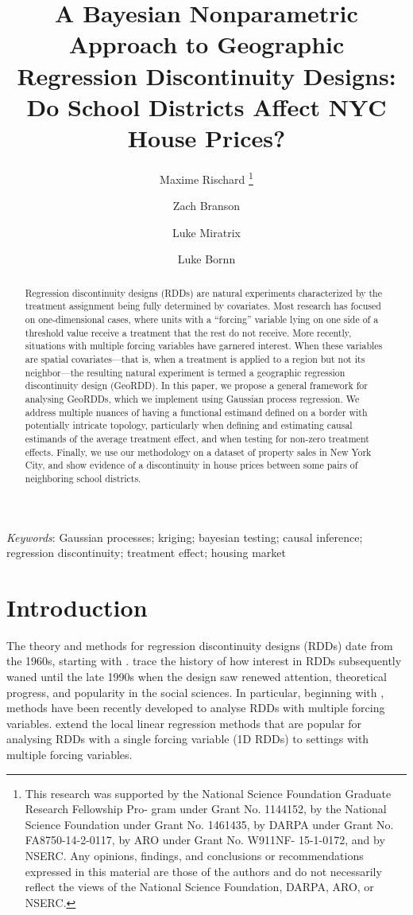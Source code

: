 \documentclass[letter,12pt]{article}
\title{
    \Large
    A Bayesian Nonparametric Approach to Geographic Regression Discontinuity Designs:
    Do School Districts Affect NYC House Prices?
}
\author[a]{Maxime Rischard
        \thanks{This research was supported by the National Science Foundation Graduate Research Fellowship Pro- gram under Grant No. 1144152, by the National Science Foundation under Grant No. 1461435, by DARPA under Grant No. FA8750-14-2-0117, by ARO under Grant No. W911NF- 15-1-0172, and by NSERC. Any opinions, findings, and conclusions or recommendations expressed in this material are those of the authors and do not necessarily reflect the views of the National Science Foundation, DARPA, ARO, or NSERC.}
    }
\author[a]{Zach Branson}
\author[b]{Luke Miratrix}
\author[c]{Luke Bornn}
\affil[a]{Department of Statistics, Harvard University}
\affil[b]{Graduate School of Education, Harvard University}
\affil[c]{Simon Fraser University}
\author{\vspace{-3em}}
\begin{document}
\maketitle

\begin{abstract}
    Regression discontinuity designs (RDDs) are natural experiments characterized by the treatment assignment being fully determined by covariates.
    Most research has focused on one-dimensional cases, where units with a ``forcing'' variable lying on one side of a threshold value receive a treatment that the rest do not receive.
    More recently, situations with multiple forcing variables have garnered interest.
    When these variables are spatial covariates---that is, when a treatment is applied to a region but not its neighbor---the resulting natural experiment is termed a geographic regression discontinuity design (GeoRDD).
    In this paper, we propose a general framework for analysing GeoRDDs, which we implement using Gaussian process regression.
    We address multiple nuances of having a functional estimand defined on a border with potentially intricate topology, particularly when defining and estimating causal estimands of the average treatment effect, and when testing for non-zero treatment effects.
    Finally, we use our methodology on a dataset of property sales in New York City,
    and show evidence of a discontinuity in house prices between some pairs of neighboring school districts.
\end{abstract}

\noindent%
{\it Keywords}: Gaussian processes; kriging; bayesian testing; causal inference; regression discontinuity; treatment effect; housing market
\vfill
\newpage

\hypertarget{introduction}{%
\section{Introduction}\label{introduction}}

The theory and methods for regression discontinuity designs (RDDs) date from the 1960s, starting with \cite{thistlethwaite1960regression}.
\cite{cook2008waiting} trace the history of how interest in RDDs subsequently waned until the late 1990s when the design saw renewed attention, theoretical progress, and popularity in the social sciences.
In particular, beginning with \cite{papay2011extending}, methods have been recently developed to analyse RDDs with multiple forcing variables.
\cite{imbens2011regression} extend the local linear regression methods \citep[see][]{imbensrdd} that are popular for analysing RDDs with a single forcing variable (1D RDDs) to settings with multiple forcing variables.
\end{document}
